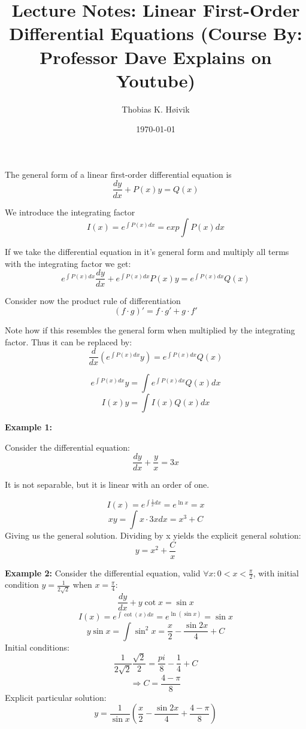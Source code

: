 \documentclass[12pt]{article}
\title{Lecture Notes: Linear First-Order Differential Equations (Course By: Professor Dave Explains on Youtube)}
\author{Thobias K. Høivik}
\date{\today}
\begin{document}
\maketitle

\noindent 
The general form of a linear first-order differential equation is 
\[ 
    \frac{dy}{dx} + P(x)y = Q(x)
\]

\noindent 
We introduce the integrating factor 
\[ 
    I(x) = e^{\int P(x) dx} = exp \displaystyle\int P(x) dx
\]

\noindent 
If we take the differential equation in it's general form and multiply all terms 
with the integrating factor we get: 
\[ 
    e^{\int P(x) dx} \frac{dy}{dx} + e^{\int P(x) dx}P(x)y = e^{\int P(x) dx}Q(x)
\]

\noindent 
Consider now the product rule of differentiation 
\[ 
    (f \cdot g)' = f \cdot g' + g \cdot f'
\]

\noindent 
Note how if this resembles the general form when multiplied by the integrating factor. 
Thus it can be replaced by: 
\[ 
    \frac{d}{dx}\left( e^{\int P(x) dx}y \right) = e^{\int P(x) dx}Q(x)
\]

\[ 
    e^{\int P(x) dx}y = \displaystyle\int e^{\int P(x) dx}Q(x)dx
\]
\[ 
    I(x)y = \displaystyle\int I(x)Q(x)dx
\]

\break 
\noindent 
\textbf{Example 1: }

\noindent 
Consider the differential equation: 
\[ 
    \frac{dy}{dx} + \frac{y}{x} = 3x
\]

\noindent 
It is not separable, but it is linear with an order of one.

\[ 
    I(x) = e^{\int \frac{1}{x} dx} = e^{\ln x} = x
\]
\[ 
    xy = \displaystyle\int x \cdot 3x dx = x^3 + C
\]
Giving us the general solution. Dividing by x yields the explicit general solution: 
\[ 
    \boxed{y = x^2 + \frac{C}{x}}
\]
 
\noindent 
\textbf{Example 2:}
Consider the differential equation, valid \(\forall x : 0 < x < \frac{\pi}{2}\), 
with initial condition \(y = \frac{1}{2\sqrt2}\)
when \(x = \frac{\pi}{4}\): 
\[ 
    \frac{dy}{dx} + y \cot x = \sin x
\]
\[ 
    I(x) = e^{\int \cot(x) dx} = e^{\ln (\sin x)} = \sin x
\]
\[ 
    y\sin x = \displaystyle\int \sin^2 x = \frac{x}{2} - \frac{\sin 2x}{4} + C 
\]
Initial conditions: 
\[
    \frac{1}{2\sqrt{2}}\frac{\sqrt2}{2} = \frac{pi}{8}-\frac{1}{4} + C
\]
\[ 
    \Rightarrow C = \frac{4 - \pi}{8}
\]
Explicit particular solution: 
\[ 
    \boxed{ y = \frac{1}{\sin x} 
    \left(  \frac{x}{2}-\frac{\sin 2x}{4}+\frac{4-\pi}{8}\right)}
\]
\end{document}
